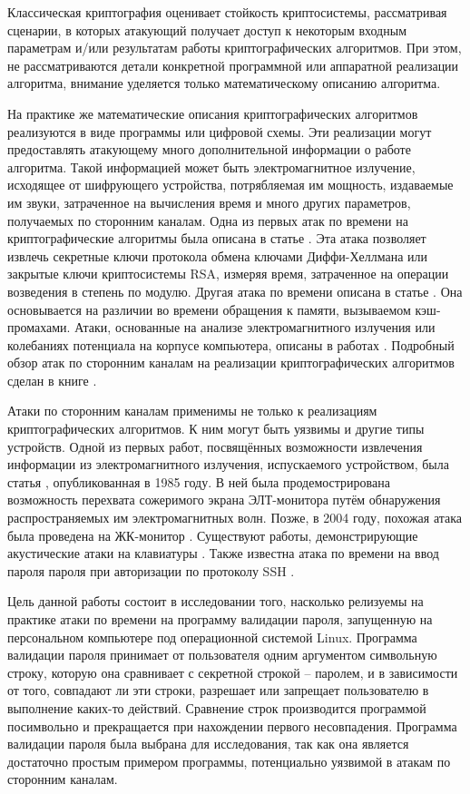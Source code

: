 
Классическая криптография оценивает стойкость криптосистемы, рассматривая
сценарии, в которых атакующий получает доступ к некоторым входным параметрам
и/или результатам работы криптографических алгоритмов. При этом, не
рассматриваются детали конкретной программной или аппаратной реализации
алгоритма, внимание уделяется только математическому описанию алгоритма.

На практике же математические описания криптографических алгоритмов реализуются
в виде программы или цифровой схемы. Эти реализации могут предоставлять
атакующему много дополнительной информации о работе алгоритма. Такой информацией
может быть электромагнитное излучение, исходящее от шифрующего устройства,
потрябляемая им мощность, издаваемые им звуки, затраченное на вычисления время и
много других параметров, получаемых по сторонним каналам. Одна из первых атак по
времени на криптографические алгоритмы была описана в статье \cite{kocher}. Эта
атака позволяет извлечь секретные ключи протокола обмена ключами Диффи-Хеллмана
или закрытые ключи криптосистемы RSA, измеряя время, затраченное на операции
возведения в степень по модулю. Другая атака по времени описана в статье
\cite{bernstein}. Она основывается на различии во времени обращения к памяти,
вызываемом кэш-промахами. Атаки, основанные на анализе электромагнитного
излучения или колебаниях потенциала на корпусе компьютера, описаны в работах
\cite{hands} \cite{em}. Подробный обзор атак по сторонним каналам на реализации
криптографических алгоритмов сделан в книге \cite{cren}.

Атаки по сторонним каналам применимы не только к реализациям криптографических
алгоритмов. К ним могут быть уязвимы и другие типы устройств. Одной из первых
работ, посвящённых возможности извлечения информации из электромагнитного
излучения, испускаемого устройством, была статья \cite{van-eck}, опубликованная
в 1985 году. В ней была продемострирована возможность перехвата сожеримого
экрана ЭЛТ-монитора путём обнаружения распространяемых им электромагнитных волн.
Позже, в 2004 году, похожая атака была проведена на ЖК-монитор \cite{kuhn}.
Существуют работы, демонстрирующие акустические атаки на клавиатуры
\cite{asonov} \cite{zhuang}. Также известна атака по времени на ввод пароля пароля
при авторизации по протоколу SSH \cite{ssh}.

Цель данной работы состоит в исследовании того, насколько релизуемы на практике
атаки по времени на программу валидации пароля, запущенную на персональном
компьютере под операционной системой Linux. Программа валидации пароля
принимает от пользователя одним аргументом символьную строку, которую она
сравнивает с секретной строкой -- паролем, и в зависимости от того, совпадают
ли эти строки, разрешает или запрещает пользователю в выполнение каких-то
действий. Сравнение строк производится программой посимвольно и прекращается
при нахождении первого несовпадения. Программа валидации пароля была выбрана
для исследования, так как она является достаточно простым примером программы,
потенциально уязвимой в атакам по сторонним каналам.

